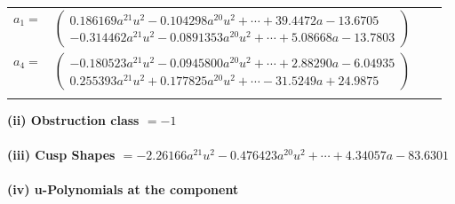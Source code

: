 \documentclass[1p]{elsarticle_modified}
\theoremstyle{definition}
\begin{document}
\begin{tabular}{m{7pt} m{180pt} m{7pt} m{180pt} }
\flushright $a_{1}=$&$\begin{pmatrix}0.186169 a^{21} u^{2}-0.104298 a^{20} u^{2}+\cdots+39.4472 a-13.6705\\-0.314462 a^{21} u^{2}-0.0891353 a^{20} u^{2}+\cdots+5.08668 a-13.7803\end{pmatrix}$ \\
\flushright $a_{4}=$&$\begin{pmatrix}-0.180523 a^{21} u^{2}-0.0945800 a^{20} u^{2}+\cdots+2.88290 a-6.04935\\0.255393 a^{21} u^{2}+0.177825 a^{20} u^{2}+\cdots-31.5249 a+24.9875\end{pmatrix}$\\&\end{tabular}
\flushleft \textbf{(ii) Obstruction class $= -1$}\\~\\
\flushleft \textbf{(iii) Cusp Shapes $= -2.26166 a^{21} u^{2}-0.476423 a^{20} u^{2}+\cdots+4.34057 a-83.6301$}\\~\\
\newpage\renewcommand{\arraystretch}{1}
\flushleft \textbf{(iv) u-Polynomials at the component}\newline \\
\end{document}
